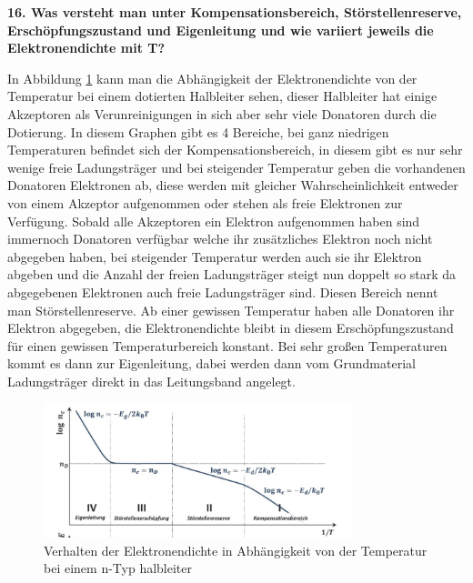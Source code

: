 \noindent\textbf{16. Was versteht man unter Kompensationsbereich, Störstellenreserve, Erschöpfungszustand und Eigenleitung und wie variiert jeweils die Elektronendichte mit T? }\\
\begin{addmargin}[25pt]{0pt}
In Abbildung \ref{fig:Elektronendichte_T_dotiert} kann man die Abhängigkeit der Elektronendichte von der Temperatur bei einem dotierten Halbleiter sehen, dieser Halbleiter hat einige Akzeptoren als Verunreinigungen in sich aber sehr viele Donatoren durch die Dotierung. In diesem Graphen gibt es 4 Bereiche, bei ganz niedrigen Temperaturen befindet sich der Kompensationsbereich, in diesem gibt es nur sehr wenige freie Ladungsträger und bei steigender Temperatur geben die vorhandenen Donatoren Elektronen ab, diese werden mit gleicher Wahrscheinlichkeit entweder von einem Akzeptor aufgenommen oder stehen als freie Elektronen zur Verfügung. Sobald alle Akzeptoren ein Elektron aufgenommen haben sind immernoch Donatoren verfügbar welche ihr zusätzliches Elektron noch nicht abgegeben haben, bei steigender Temperatur werden auch sie ihr Elektron abgeben und die Anzahl der freien Ladungsträger steigt nun doppelt so stark da abgegebenen Elektronen auch freie Ladungsträger sind. Diesen Bereich nennt man Störstellenreserve. Ab einer gewissen Temperatur haben alle Donatoren ihr Elektron abgegeben, die Elektronendichte bleibt in diesem Erschöpfungszustand für einen gewissen Temperaturbereich konstant. Bei sehr großen Temperaturen kommt es dann zur Eigenleitung, dabei werden dann vom Grundmaterial Ladungsträger direkt in das Leitungsband angelegt.\\
\begin{figure}[h]
    \centering
    \includegraphics[width = 0.8\textwidth]{images/KM2/Elektronendichte_T_dotierteHL.jpeg}
    \caption{Verhalten der Elektronendichte in Abhängigkeit von der Temperatur bei einem n-Typ halbleiter}
    \label{fig:Elektronendichte_T_dotiert}
\end{figure}
\end{addmargin}

